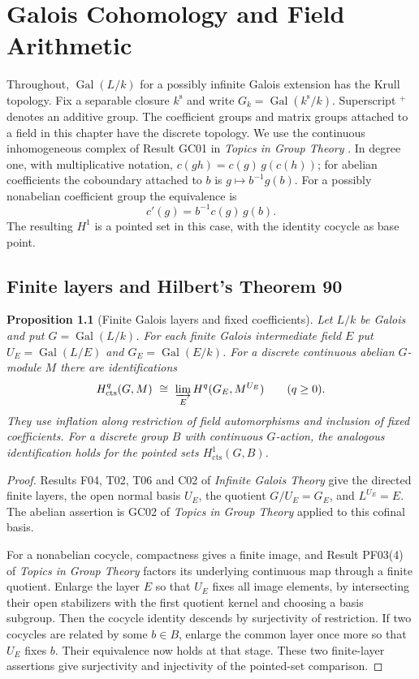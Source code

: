 \documentclass[11pt,oneside,openany]{book}
\newtheorem{proposition}[theorem]{Proposition}
\theoremstyle{definition}
\theoremstyle{remark}
\begin{document}
\chapter{Galois Cohomology and Field Arithmetic}
\label{ch:galois-cohomology}

Throughout, \(\operatorname{Gal}(L/k)\) for a possibly infinite Galois
extension has the Krull topology. Fix a separable closure \(k^{\mathrm s}\)
and write \(G_k=\operatorname{Gal}(k^{\mathrm s}/k)\). Superscript
\({}^{+}\) denotes an additive group. The coefficient groups and matrix
groups attached to a field in this chapter have the discrete topology.
We use the continuous inhomogeneous complex of Result GC01 in
\emph{Topics in Group Theory} \cite[PDF p.~24]{mg-groups}. In degree one,
with multiplicative notation, \(c(gh)=c(g)\,g(c(h))\); for abelian
coefficients the coboundary attached to \(b\) is \(g\mapsto b^{-1}g(b)\).
For a possibly nonabelian coefficient group the equivalence is
\[
 c'(g)=b^{-1}c(g)\,g(b).
\]
The resulting \(H^1\) is a pointed set in this case, with the identity
cocycle as base point.

\section{Finite layers and Hilbert's Theorem 90}

\begin{proposition}[Finite Galois layers and fixed coefficients]
\label{res:GH01}
Let \(L/k\) be Galois and put \(G=\operatorname{Gal}(L/k)\).
For each finite Galois intermediate field \(E\) put
\(U_E=\operatorname{Gal}(L/E)\) and
\(G_E=\operatorname{Gal}(E/k)\). For a discrete continuous abelian
\(G\)-module \(M\) there are identifications
\[
 H^q_{\mathrm{cts}}(G,M)
   \ \cong\ \varinjlim_E H^q(G_E,M^{U_E})\qquad(q\geq 0).
\]
They use inflation along restriction of field automorphisms and inclusion
of fixed coefficients. For a discrete group \(B\) with continuous
\(G\)-action, the analogous identification holds for the pointed sets
\(H^1_{\mathrm{cts}}(G,B)\).
\end{proposition}
\begin{proof}
Results F04, T02, T06 and C02 of \emph{Infinite Galois Theory}
\cite[PDF pp.~5, 9--10, 12]{mg-aft} give the directed finite layers,
the open normal basis \(U_E\), the quotient \(G/U_E=G_E\), and
\(L^{U_E}=E\). The abelian assertion is GC02 of \emph{Topics in Group
Theory} \cite[PDF p.~24]{mg-groups} applied to this cofinal basis.

For a nonabelian cocycle, compactness gives a finite image, and
Result PF03(4) of \emph{Topics in Group Theory}
\cite[PDF p.~16]{mg-groups} factors its underlying continuous map
through a finite quotient. Enlarge the layer \(E\) so that \(U_E\)
fixes all image elements, by intersecting their open stabilizers
with the first quotient kernel and choosing a basis subgroup.
Then the cocycle identity descends by surjectivity of restriction.
If two cocycles are related by some \(b\in B\), enlarge the common
layer once more so that \(U_E\) fixes \(b\). Their equivalence now
holds at that stage. These two finite-layer assertions give
surjectivity and injectivity of the pointed-set comparison.
\end{proof}
\end{document}
